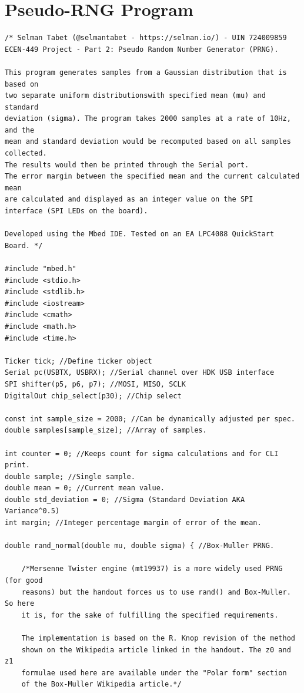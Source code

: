 \documentclass{article}
\begin{document}
\section*{Pseudo-RNG Program}
\begin{verbatim}
/* Selman Tabet (@selmantabet - https://selman.io/) - UIN 724009859
ECEN-449 Project - Part 2: Pseudo Random Number Generator (PRNG).

This program generates samples from a Gaussian distribution that is based on
two separate uniform distributionswith specified mean (mu) and standard
deviation (sigma). The program takes 2000 samples at a rate of 10Hz, and the
mean and standard deviation would be recomputed based on all samples collected.
The results would then be printed through the Serial port.
The error margin between the specified mean and the current calculated mean
are calculated and displayed as an integer value on the SPI 
interface (SPI LEDs on the board).

Developed using the Mbed IDE. Tested on an EA LPC4088 QuickStart Board. */

#include "mbed.h"
#include <stdio.h>
#include <stdlib.h>
#include <iostream>
#include <cmath>
#include <math.h>
#include <time.h>

Ticker tick; //Define ticker object
Serial pc(USBTX, USBRX); //Serial channel over HDK USB interface
SPI shifter(p5, p6, p7); //MOSI, MISO, SCLK
DigitalOut chip_select(p30); //Chip select

const int sample_size = 2000; //Can be dynamically adjusted per spec.
double samples[sample_size]; //Array of samples.

int counter = 0; //Keeps count for sigma calculations and for CLI print.
double sample; //Single sample.
double mean = 0; //Current mean value.
double std_deviation = 0; //Sigma (Standard Deviation AKA Variance^0.5)
int margin; //Integer percentage margin of error of the mean.

double rand_normal(double mu, double sigma) { //Box-Muller PRNG.

    /*Mersenne Twister engine (mt19937) is a more widely used PRNG (for good
    reasons) but the handout forces us to use rand() and Box-Muller. So here
    it is, for the sake of fulfilling the specified requirements.
    
    The implementation is based on the R. Knop revision of the method
    shown on the Wikipedia article linked in the handout. The z0 and z1
    formulae used here are available under the "Polar form" section
    of the Box-Muller Wikipedia article.*/
    

\end{verbatim}
\end{document}

